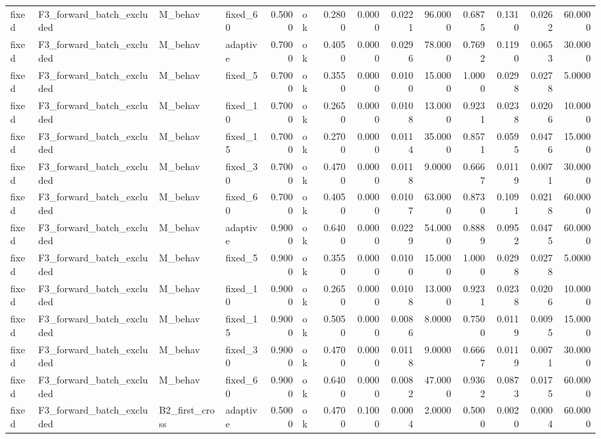 \begin{table}
\begin{tabular}{llllrlrrrrrrrr}
fixed & F3\_forward\_batch\_excluded & M\_behav & fixed\_60 & 0.5000 & ok & 0.2800 & 0.0000 & 0.0221 & 96.0000 & 0.6875 & 0.1310 & 0.0262 & 60.0000 \\
fixed & F3\_forward\_batch\_excluded & M\_behav & adaptive & 0.7000 & ok & 0.4050 & 0.0000 & 0.0296 & 78.0000 & 0.7692 & 0.1190 & 0.0653 & 30.0000 \\
fixed & F3\_forward\_batch\_excluded & M\_behav & fixed\_5 & 0.7000 & ok & 0.3550 & 0.0000 & 0.0100 & 15.0000 & 1.0000 & 0.0298 & 0.0278 & 5.0000 \\
fixed & F3\_forward\_batch\_excluded & M\_behav & fixed\_10 & 0.7000 & ok & 0.2650 & 0.0000 & 0.0108 & 13.0000 & 0.9231 & 0.0238 & 0.0206 & 10.0000 \\
fixed & F3\_forward\_batch\_excluded & M\_behav & fixed\_15 & 0.7000 & ok & 0.2700 & 0.0000 & 0.0114 & 35.0000 & 0.8571 & 0.0595 & 0.0476 & 15.0000 \\
fixed & F3\_forward\_batch\_excluded & M\_behav & fixed\_30 & 0.7000 & ok & 0.4700 & 0.0000 & 0.0118 & 9.0000 & 0.6667 & 0.0119 & 0.0071 & 30.0000 \\
fixed & F3\_forward\_batch\_excluded & M\_behav & fixed\_60 & 0.7000 & ok & 0.4050 & 0.0000 & 0.0107 & 63.0000 & 0.8730 & 0.1091 & 0.0218 & 60.0000 \\
fixed & F3\_forward\_batch\_excluded & M\_behav & adaptive & 0.9000 & ok & 0.6400 & 0.0000 & 0.0229 & 54.0000 & 0.8889 & 0.0952 & 0.0475 & 60.0000 \\
fixed & F3\_forward\_batch\_excluded & M\_behav & fixed\_5 & 0.9000 & ok & 0.3550 & 0.0000 & 0.0100 & 15.0000 & 1.0000 & 0.0298 & 0.0278 & 5.0000 \\
fixed & F3\_forward\_batch\_excluded & M\_behav & fixed\_10 & 0.9000 & ok & 0.2650 & 0.0000 & 0.0108 & 13.0000 & 0.9231 & 0.0238 & 0.0206 & 10.0000 \\
fixed & F3\_forward\_batch\_excluded & M\_behav & fixed\_15 & 0.9000 & ok & 0.5050 & 0.0000 & 0.0086 & 8.0000 & 0.7500 & 0.0119 & 0.0095 & 15.0000 \\
fixed & F3\_forward\_batch\_excluded & M\_behav & fixed\_30 & 0.9000 & ok & 0.4700 & 0.0000 & 0.0118 & 9.0000 & 0.6667 & 0.0119 & 0.0071 & 30.0000 \\
fixed & F3\_forward\_batch\_excluded & M\_behav & fixed\_60 & 0.9000 & ok & 0.6400 & 0.0000 & 0.0082 & 47.0000 & 0.9362 & 0.0873 & 0.0175 & 60.0000 \\
fixed & F3\_forward\_batch\_excluded & B2\_first\_cross & adaptive & 0.5000 & ok & 0.4700 & 0.1000 & 0.0004 & 2.0000 & 0.5000 & 0.0020 & 0.0004 & 60.0000 \\

\end{tabular}
\end{table}
